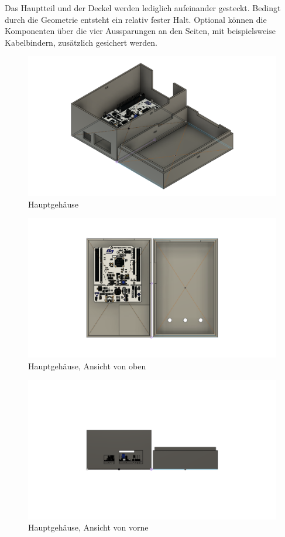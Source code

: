 Das Hauptteil und der Deckel werden lediglich aufeinander gesteckt. Bedingt durch die Geometrie entsteht ein relativ fester Halt. Optional können die Komponenten über die vier Aussparungen an den Seiten, mit beispielsweise Kabelbindern, zusätzlich gesichert werden.
\begin{figure}[H]
  \centering
  \includegraphics[width=\textwidth]{./img/ST_MainBodyv13}
  \caption{Hauptgehäuse}\label{fig:main}
\end{figure}
\begin{figure}[H]
  \centering
  \includegraphics[width=\textwidth]{./img/ST_MainBodyv13_top}
  \caption{Hauptgehäuse, Ansicht von oben}\label{fig:main_top}
\end{figure}
\begin{figure}[H]
  \centering
  \includegraphics[width=\textwidth]{./img/ST_MainBodyv13_front}
  \caption{Hauptgehäuse, Ansicht von vorne}\label{fig:main_front}
\end{figure}
